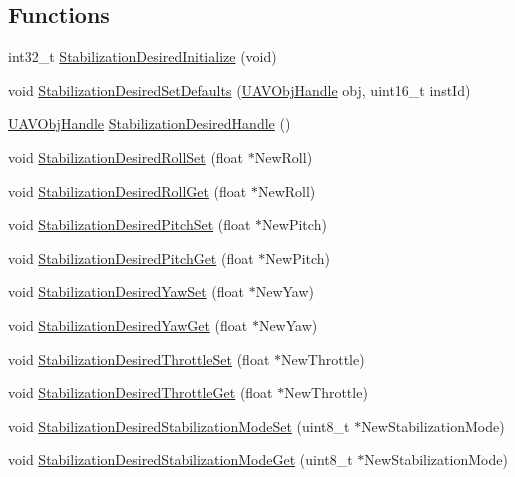 \subsection*{\-Functions}
\begin{DoxyCompactItemize}
\item 
int32\-\_\-t \hyperlink{group___stabilization_desired_ga3633c58c241b68d2d7b9393999105594}{\-Stabilization\-Desired\-Initialize} (void)
\item 
void \hyperlink{group___stabilization_desired_ga129dea13f0d90f8cc00e7cdb4f1128ae}{\-Stabilization\-Desired\-Set\-Defaults} (\hyperlink{targets_2_u_a_v_objects_2inc_2uavobjectmanager_8h_a279053e22be53ce9f895043aaeb91e3b}{\-U\-A\-V\-Obj\-Handle} obj, uint16\-\_\-t inst\-Id)
\item 
\hyperlink{targets_2_u_a_v_objects_2inc_2uavobjectmanager_8h_a279053e22be53ce9f895043aaeb91e3b}{\-U\-A\-V\-Obj\-Handle} \hyperlink{group___stabilization_desired_ga5361e0418552af25d6db84f355d28ab1}{\-Stabilization\-Desired\-Handle} ()
\item 
void \hyperlink{group___stabilization_desired_ga2260ab836240da2e13170448099caaf0}{\-Stabilization\-Desired\-Roll\-Set} (float $\ast$\-New\-Roll)
\item 
void \hyperlink{group___stabilization_desired_gaf3f5fbb2365d9d1db9c7c36569e48703}{\-Stabilization\-Desired\-Roll\-Get} (float $\ast$\-New\-Roll)
\item 
void \hyperlink{group___stabilization_desired_ga03ab81f127a92e15dfc9d772cc99a189}{\-Stabilization\-Desired\-Pitch\-Set} (float $\ast$\-New\-Pitch)
\item 
void \hyperlink{group___stabilization_desired_gac414e45de218f9d8aa8a1c742984c495}{\-Stabilization\-Desired\-Pitch\-Get} (float $\ast$\-New\-Pitch)
\item 
void \hyperlink{group___stabilization_desired_ga6cbb1bcba94ca4ddf808d4301f2fba25}{\-Stabilization\-Desired\-Yaw\-Set} (float $\ast$\-New\-Yaw)
\item 
void \hyperlink{group___stabilization_desired_ga9c40b66c4e999ae65033fbdd4c203221}{\-Stabilization\-Desired\-Yaw\-Get} (float $\ast$\-New\-Yaw)
\item 
void \hyperlink{group___stabilization_desired_ga5479524d583213c8e5ce2f1a3c93e09b}{\-Stabilization\-Desired\-Throttle\-Set} (float $\ast$\-New\-Throttle)
\item 
void \hyperlink{group___stabilization_desired_ga25064ad9da6c6551dfb3ef96d1a30be6}{\-Stabilization\-Desired\-Throttle\-Get} (float $\ast$\-New\-Throttle)
\item 
void \hyperlink{group___stabilization_desired_gab1237342fd9ca4c5becb58c25ffab355}{\-Stabilization\-Desired\-Stabilization\-Mode\-Set} (uint8\-\_\-t $\ast$\-New\-Stabilization\-Mode)
\item 
void \hyperlink{group___stabilization_desired_ga85608964fbd5a47f319096ab1576d10b}{\-Stabilization\-Desired\-Stabilization\-Mode\-Get} (uint8\-\_\-t $\ast$\-New\-Stabilization\-Mode)
\end{DoxyCompactItemize}


